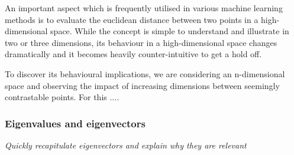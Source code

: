 An important aspect which is frequently utilised in various machine learning methods is to evaluate the euclidean distance between two points in a high-dimensional space.
While the concept is simple to understand and illustrate in two or three dimensions, its behaviour in a high-dimensional space changes dramatically and it becomes heavily counter-intuitive to get a hold off.

To discover its behavioural implications, we are considering an n-dimensional space and observing the impact of increasing dimensions between seemingly contrastable points. 
For this .... 

\subsubsection{Eigenvalues and eigenvectors}

\begin{center}
	\textit{Quickly recapitulate eigenvectors and explain why they are relevant}
\end{center}
